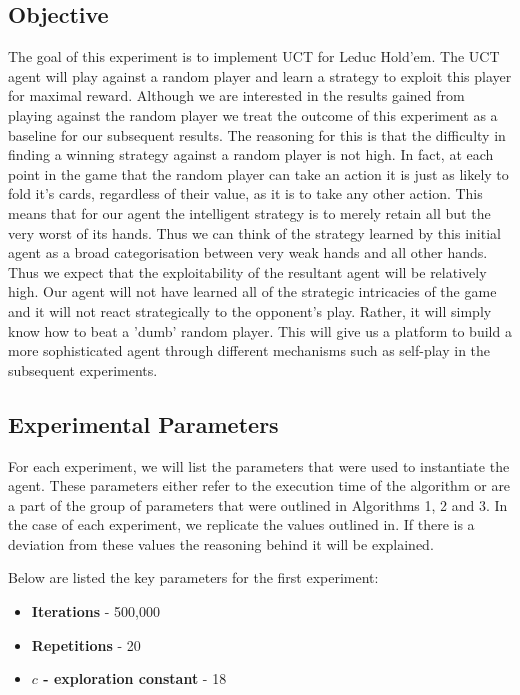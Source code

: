 \subsection{Objective}\label{subsec:objective1}
The goal of this experiment is to implement UCT for Leduc Hold'em.
The UCT agent will play against a random player and learn a strategy to exploit this player for
maximal reward.
Although we are interested in the results gained from playing against the random player we treat the
outcome of this experiment as a baseline for our subsequent results.
The reasoning for this is that the difficulty in finding a winning strategy against a random player
is not high.
In fact, at each point in the game that the random player can take an action it is
just as likely to fold it's cards, regardless of their value, as it is to take any other action.
This means that for our agent the intelligent strategy is to merely retain all but the
very worst of its hands.
Thus we can think of the strategy learned by this initial agent as a broad
categorisation between very weak hands and all other hands.
Thus we expect that the exploitability of the resultant agent will be relatively high.
Our agent will not have learned all of the strategic intricacies of the game
and it will not react strategically to the opponent's play.
Rather, it will simply know how to beat a 'dumb' random player.
This will give us a platform to build a more sophisticated agent through different mechanisms such as
self-play in the subsequent experiments.

\subsection{Experimental Parameters}\label{subsec:algAndCoding1}
For each experiment, we will list the parameters that were used to instantiate the agent.
These parameters either refer to the execution time of the algorithm or are a part of
the group of parameters that were outlined in Algorithms 1, 2 and 3.
In the case of each experiment, we replicate the values outlined in\citep{heinrich2017reinforcement}.
If there is a deviation from these values the reasoning behind it will be explained.

Below are listed the key parameters for the first experiment:
\begin{itemize}
    \item \textbf{Iterations} - 500,000
    \item \textbf{Repetitions} - 20
    \item \textbf{$c$ - exploration constant} - 18
\end{itemize}

